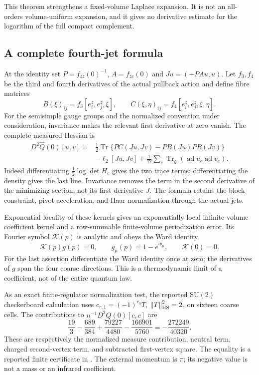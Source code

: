 \documentclass[11pt,oneside,openany]{book}
\theoremstyle{definition}
\theoremstyle{remark}
\newcommand{\ii}{\mathrm i}
\newcommand{\Tr}{\operatorname{Tr}}
\newcommand{\SU}{\mathrm{SU}}
\newcommand{\norm}[1]{\left\lVert#1\right\rVert}
\newcommand{\src}[2]{\cite[#2]{#1}}
\begin{document}
This theorem strengthens a fixed-volume Laplace expansion. It is not
an all-orders volume-uniform expansion, and it gives no derivative
estimate for the logarithm of the full compact complement.

\subsection{A complete fourth-jet formula}
At the identity set $P=f_{zz}(0)^{-1}$, $A=f_{zc}(0)$ and
$Ju=(-PAu,u)$. Let $f_3,f_4$ be the third and fourth derivatives of
the actual pullback action and define fibre matrices
\[
 B(\xi)_{ij}=f_3[e_i^z,e_j^z,\xi],\qquad
 C(\xi,\eta)_{ij}=f_4[e_i^z,e_j^z,\xi,\eta].
\]
For the semisimple gauge groups and the normalized convention under
consideration, invariance makes the relevant first derivative at zero
vanish. The complete measured Hessian is
\begin{equation}\label{eq:complete-fourth-jet}
\begin{split}
 D^2\widehat Q(0)[u,v]={}&\tfrac12\Tr\{P C(Ju,Jv)
                       -P B(Ju)P B(Jv)\}\\
 &-\ell_2[Ju,Jv]
       +\tfrac1{12}\sum_e\Tr_{\mathfrak g}
                       (\operatorname{ad}u_e\operatorname{ad}v_e).
\end{split}
\end{equation}
Indeed differentiating $\tfrac12\log\det H_c$ gives the two trace
terms; differentiating the density gives the last line. Invariance
removes the term in the second derivative of the minimizing section,
not its first derivative $J$. The formula retains the block constraint,
pivot acceleration, and Haar normalization through the actual jets.
\src{F11}{V91--V93}

Exponential locality of these kernels gives an exponentially local
infinite-volume coefficient kernel and a row-summable finite-volume
periodization error. Its Fourier symbol $\mathcal K(p)$ is analytic
and obeys the Ward identity
\[
 \mathcal K(p)g(p)=0,\qquad g_\mu(p)=1-e^{\ii p_\mu},\qquad
 \mathcal K(0)=0.
\]
For the last assertion differentiate the Ward identity once at zero;
the derivatives of $g$ span the four coarse directions. This is a
thermodynamic limit of a coefficient, not of the entire quantum law.

As an exact finite-regulator normalization test, the reported
$\SU(2)$ checkerboard calculation uses
$c_{r,1}=(-1)^{r_0}T$, $\norm T_{\rm HS}^2=2$, on sixteen coarse cells.
The contributions to $n^{-1}D^2\widehat Q(0)[c,c]$ are
\[
 \frac{19}{3}-\frac{689}{384}
          +\frac{79227}{4480}-\frac{166901}{5760}
                      =-\frac{272249}{40320}.
\]
These are respectively the normalized measure contribution, neutral
term, charged second-vertex term, and subtracted first-vertex square.
The equality is a reported finite certificate in \src{F11}{V94--V99}.
The external momentum is $\pi$; its negative value is not a mass or an
infrared coefficient.
\end{document}

